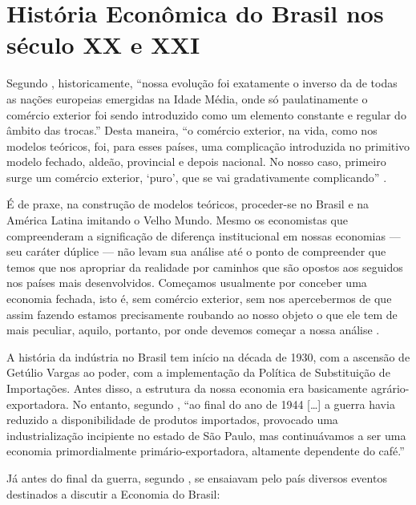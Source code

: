 \documentclass[
	10pt,				%
	openright,			%
	twoside,			%
	a5paper,			%
	english,			%
	french,				%
	spanish,			%
	brazil				%
	]{abntex2}
\renewenvironment{quote}
  {\small\list{}{\rightmargin=0.1cm \leftmargin=4cm}%
   \item\relax}
  {\endlist}
\begin{document}
\section{História Econômica do Brasil nos século XX e
XXI}\label{sec:historia_economica}

Segundo , historicamente, ``nossa
evolução foi exatamente o inverso da de todas as nações europeias
emergidas na Idade Média, onde só paulatinamente o comércio exterior foi
sendo introduzido como um elemento constante e regular do âmbito das
trocas.'' Desta maneira, ``o comércio exterior, na vida, como nos
modelos teóricos, foi, para esses países, uma complicação introduzida no
primitivo modelo fechado, aldeão, provincial e depois nacional. No nosso
caso, primeiro surge um comércio exterior, `puro', que se vai
gradativamente complicando'' \cite[p.~208]{rangel1956}.

\begin{quote}
É de praxe, na construção de modelos teóricos, proceder-se no Brasil e
na América Latina imitando o Velho Mundo. Mesmo os economistas que
compreenderam a significação de diferença institucional em nossas
economias --- seu caráter dúplice --- não levam sua análise até o ponto
de compreender que temos que nos apropriar da realidade por caminhos que
são opostos aos seguidos nos países mais desenvolvidos. Começamos
usualmente por conceber uma economia fechada, isto é, sem comércio
exterior, sem nos apercebermos de que assim fazendo estamos precisamente
roubando ao nosso objeto o que ele tem de mais peculiar, aquilo,
portanto, por onde devemos começar a nossa análise
\cite[p.~208]{rangel1956}.
\end{quote}

A história da indústria no Brasil tem início na década de 1930, com a
ascensão de Getúlio Vargas ao poder, com a implementação da Política de
Substituição de Importações. Antes disso, a estrutura da nossa economia
era basicamente agrário-exportadora. No entanto, segundo
, ``ao final do ano de 1944
{[}\ldots{}{]} a guerra havia reduzido a disponibilidade de produtos
importados, provocado uma industrialização incipiente no estado de São
Paulo, mas continuávamos a ser uma economia primordialmente
primário-exportadora, altamente dependente do café.''

Já antes do final da guerra, segundo , se
ensaiavam pelo país diversos eventos destinados a discutir a Economia do
Brasil:
\end{document}
